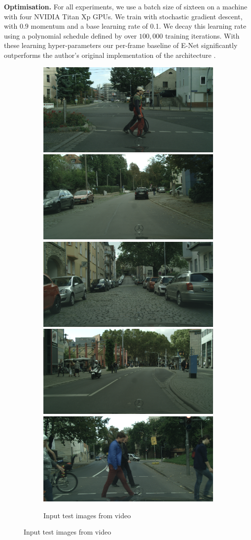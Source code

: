 \textbf{Optimisation.} For all experiments, we use a batch size of sixteen on a machine with four NVIDIA Titan Xp GPUs. We train with stochastic gradient descent, with $0.9$ momentum and a base learning rate of 0.1. We decay this learning rate using a polynomial schedule defined by \citep{chen14semantic} over $100,000$ training iterations. With these learning hyper-parameters our per-frame baseline of E-Net significantly outperforms the author's original implementation of the architecture \citep{paszke2016enet}.

\begin{figure}[t]
\begin{subfigure}[t]{\linewidth}
\begin{center}
\includegraphics[width=0.19\linewidth]{image_000050_000019_image.png}
\includegraphics[width=0.19\linewidth]{image_000045_000019_image.png}
\includegraphics[width=0.19\linewidth]{image_000046_000019_image.png}
\includegraphics[width=0.19\linewidth]{image_000038_000019_image.png}
\includegraphics[width=0.19\linewidth]{image_000071_000019_image.png}
\vspace{-2mm}
  \caption{Input test images from video}
\end{center}
\end{subfigure}


\end{figure}
